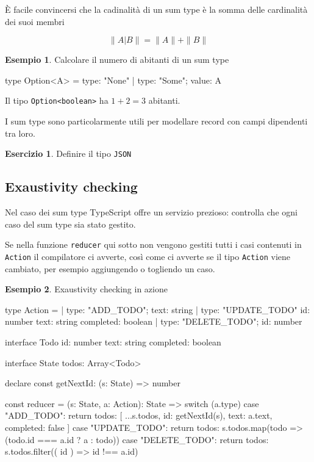 \documentclass[12pt]{article}
\theoremstyle{definition}
\newtheorem{example}{Esempio}[subsection]
\newtheorem{exercise}{Esercizio}[subsection]
\newenvironment{code}
  {\vspace{0.5cm} \VerbatimEnvironment\begin{typescriptcode}}
  {\end{typescriptcode} \vspace{0.2cm}}
\begin{document}
È facile convincersi che la cadinalità di un sum type è la somma delle cardinalità dei suoi membri

$$
\|A | B\| = \|A\| + \|B\|
$$

\begin{example}
Calcolare il numero di abitanti di un sum type

\begin{code}
type Option<A> = { type: "None" } | { type: "Some"; value: A }
\end{code}

Il tipo \texttt{Option<boolean>} ha $1 + 2 = 3$ abitanti.
\end{example}

I sum type sono particolarmente utili per modellare record con campi dipendenti tra loro.

\begin{exercise}
Definire il tipo \texttt{JSON}
\end{exercise}

\subsection{Exaustivity checking}

Nel caso dei sum type TypeScript offre un servizio prezioso: controlla che ogni caso del sum type sia stato gestito.

Se nella funzione \texttt{reducer} qui sotto non vengono gestiti tutti i casi contenuti in \texttt{Action} il compilatore ci avverte, così come
ci avverte se il tipo \texttt{Action} viene cambiato, per esempio aggiungendo o togliendo un caso.

\begin{example}
Exaustivity checking in azione

\begin{code}
type Action =
  | { type: "ADD_TODO"; text: string }
  | {
      type: "UPDATE_TODO"
      id: number
      text: string
      completed: boolean
    }
  | { type: "DELETE_TODO"; id: number }

interface Todo {
  id: number
  text: string
  completed: boolean
}

interface State {
  todos: Array<Todo>
}

declare const getNextId: (s: State) => number

const reducer = (s: State, a: Action): State => {
  switch (a.type) {
    case "ADD_TODO":
      return {
        todos: [
          ...s.todos,
          { id: getNextId(s), text: a.text, completed: false }
        ]
      }
    case "UPDATE_TODO":
      return {
        todos: s.todos.map(todo =>
          (todo.id === a.id ? a : todo))
      }
    case "DELETE_TODO":
      return {
        todos: s.todos.filter(({ id }) => id !== a.id)
      }
  }
}
\end{code}
\end{example}
\end{document}
